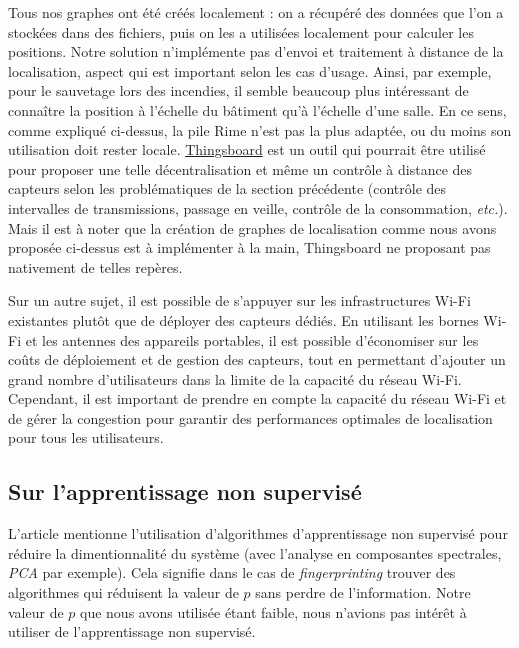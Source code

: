 \documentclass[french, a4paper, 12pt, parskip]{scrartcl}
\begin{document}
Tous nos graphes ont été créés localement : on a récupéré des données que l'on
a stockées dans des fichiers, puis on les a utilisées localement pour calculer
les positions. Notre solution n'implémente pas d'envoi et traitement à distance
de la localisation, aspect qui est important selon les cas d'usage. Ainsi, par
exemple, pour le sauvetage lors des incendies, il semble beaucoup plus
intéressant de connaître la position à l'échelle du bâtiment qu'à l'échelle
d'une salle. En ce sens, comme expliqué ci-dessus, la pile Rime n'est pas la
plus adaptée, ou du moins son utilisation doit rester locale.
\href{https://thingsboard.io/}{Thingsboard} est un outil qui pourrait être
utilisé pour proposer une telle décentralisation et même un contrôle à distance
des capteurs selon les problématiques de la section précédente (contrôle des
intervalles de transmissions, passage en veille, contrôle de la consommation,
\textit{etc.}). Mais il est à noter que la création de graphes de localisation
comme nous avons proposée ci-dessus est à implémenter à la main, Thingsboard ne
proposant pas nativement de telles repères.

Sur un autre sujet, il est possible de s'appuyer sur les infrastructures Wi-Fi
existantes plutôt que de déployer des capteurs dédiés. En utilisant les bornes
Wi-Fi et les antennes des appareils portables, il est possible d'économiser sur
les coûts de déploiement et de gestion des capteurs, tout en permettant
d'ajouter un grand nombre d'utilisateurs dans la limite de la capacité du
réseau Wi-Fi. Cependant, il est important de prendre en compte la capacité du
réseau Wi-Fi et de gérer la congestion pour garantir des performances optimales
de localisation pour tous les utilisateurs.

\subsection{Sur l'apprentissage non supervisé}

L'article \cite{RSSI} mentionne l'utilisation d'algorithmes d'apprentissage non
supervisé pour réduire la dimentionnalité du système (avec l'analyse en
composantes spectrales, \textit{PCA} par exemple). Cela signifie dans le cas de
\textit{fingerprinting} trouver des algorithmes qui réduisent la valeur de $p$
sans perdre de l'information. Notre valeur de $p$ que nous avons utilisée étant
faible, nous n'avions pas intérêt à utiliser de l'apprentissage non supervisé.

\newpage

\appendix
\end{document}
